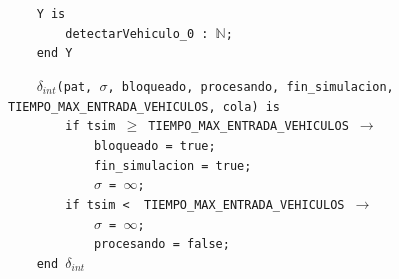 \documentclass[12pt]{article}
\begin{document}
\begin{tcolorbox}[
    colback=black!5!white,
    colframe=black!80!white,
    boxrule=0.8pt,
    arc=2pt,
    left=5pt,
    right=5pt,
    top=5pt,
    bottom=5pt,
    fontupper=\ttfamily,
    breakable
]
\begin{flushleft}
\texttt{~~~~Y is} \\
\texttt{~~~~~~~~detectarVehiculo\_0 : }\(\mathbb{N}\)\texttt{;} \\
\texttt{~~~~end Y}
\end{flushleft}

\begin{flushleft}
\texttt{~~~~}$\delta_{int}$\texttt{(pat, }$\sigma$\texttt{, bloqueado, procesando, fin\_simulacion, TIEMPO\_MAX\_ENTRADA\_VEHICULOS, cola) is} \\
\texttt{~~~~~~~~if tsim $\ge$ TIEMPO\_MAX\_ENTRADA\_VEHICULOS $\rightarrow$} \\
\texttt{~~~~~~~~~~~~bloqueado = true;} \\
\texttt{~~~~~~~~~~~~fin\_simulacion = true;} \\
\texttt{~~~~~~~~~~~~}$\sigma$\texttt{ = }\(\infty\)\texttt{;} \\
\texttt{~~~~~~~~if tsim < \ TIEMPO\_MAX\_ENTRADA\_VEHICULOS $\rightarrow$} \\
\texttt{~~~~~~~~~~~~}$\sigma$\texttt{ = }\(\infty\)\texttt{;} \\
\texttt{~~~~~~~~~~~~procesando = false;} \\
\texttt{~~~~end }$\delta_{int}$
\end{flushleft}


\end{tcolorbox}
\end{document}
